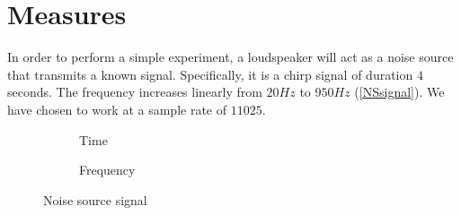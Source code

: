 \section{Measures}
In order to perform a simple experiment, a loudspeaker will act as a noise source that transmits a known signal. Specifically, it is a chirp signal of duration $4$ seconds. The frequency increases linearly from $20 \si{Hz}$ to $950\si{Hz}$ (\autoref{NSsignal}). We have chosen to work at a sample rate of $11025$.
\begin{figure}[h]
	\begin{subfigure}[b]{0.49\textwidth}
	\centering
	\def\svgwidth{0.9\columnwidth}
	\graphicspath{{Img/}}
	{\fontsize{5}{12}\selectfont
		
	}
	\caption{Time}
	\end{subfigure}
	\begin{subfigure}[b]{0.49\textwidth}
	\centering
	\def\svgwidth{0.9\columnwidth}
	\graphicspath{{Img/}}
	{\fontsize{5}{12}\selectfont
		
	}
	\caption{Frequency}
\end{subfigure}
	\caption{Noise source signal}
	\label{NSsignal}
\end{figure}
%			
%			

